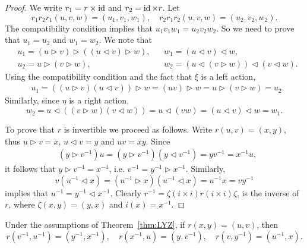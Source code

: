 \begin{proof}
We write $r_1=r\times\operatorname{id}$ and $r_2=\operatorname{id}\times r$. Let
\[
r_1r_2r_1(u,v,w)=(u_1,v_1,w_1),\quad
r_2r_1r_2(u,v,w)=(u_2,v_2,w_2).
\]
The compatibility condition implies that $u_1v_1w_1=u_2v_2w_2$. 
So we need to prove that $u_1=u_2$ and $w_1=w_2$. We note that
\begin{align*}
&u_1=(u\rhd v)\rhd ( (u\lhd v)\rhd w),
&&w_1=(u\lhd v)\lhd w,\\
&u_2=u\rhd (v\rhd w),
&&w_2=(u\lhd (v\rhd w))\lhd (v\lhd w).
\end{align*}
Using the compatibility condition and the fact that $\xi$ is a left action, 
\begin{align*}
    &u_1=((u\rhd v)(u\lhd v))\rhd w=(uv)\rhd w=u\rhd (v\rhd w)=u_2.
\end{align*}
Similarly, since $\eta$ is a right action, 
\[
w_2=u\lhd ((v\rhd w)(v\lhd w))=u\lhd (vw)=(u\lhd v)\lhd w=w_1.
\]

To prove that $r$ is invertible we proceed as follows. 
Write $r(u,v)=(x,y)$, thus $u\rhd v=x$, $u\lhd v=y$ and $uv=xy$. Since 
\begin{align*}
& (y\rhd v^{-1})u=(y\rhd v^{-1})(y\lhd v^{-1})=yv^{-1}=x^{-1}u,
\end{align*}
it follows that $y\rhd v^{-1}=x^{-1}$, i.e. $v^{-1}=y^{-1}\rhd x^{-1}$. Similarly, 
\[
v(u^{-1}\lhd x)=(u^{-1}\rhd x)(u^{-1}\lhd x)=u^{-1}x=vy^{-1}
\]
implies that $u^{-1}=y^{-1}\lhd x^{-1}$. Clearly 
$r^{-1}=\zeta (i\times i) r (i\times i) \zeta$,
is the inverse of $r$, where $\zeta(x,y)=(y,x)$ and $i(x)=x^{-1}$. 
\end{proof}

\begin{proposition}\label{prop:LYZ}
Under the assumptions of Theorem~\ref{thm:LYZ}, 
if $r(x,y)=(u,v)$, then 
\[
r(v^{-1},u^{-1})=(y^{-1},x^{-1}),
\quad
r(x^{-1},u)=(y,v^{-1}),
\quad
r(v,y^{-1})=(u^{-1},x).
\]
\end{proposition}


